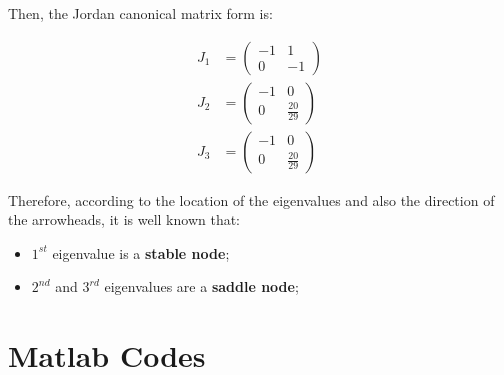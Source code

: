 \documentclass[a4paper,10pt]{article}
\begin{document}
Then, the Jordan canonical matrix form is:

\begin{eqnarray*}
J_1 &= \left(\begin{array}{cc} -1 & 1\\ 0 & -1 \end{array}\right) \\
J_2 &= \left(\begin{array}{cc} -1 & 0\\ 0 & \frac{20}{29} \end{array}\right) \\
J_3 &= \left(\begin{array}{cc} -1 & 0\\ 0 & \frac{20}{29} \end{array}\right)
\end{eqnarray*}

Therefore, according to the location of the eigenvalues and also the direction of the arrowheads, it is well known that: 
\begin{itemize}
 \item $1^{st}$ eigenvalue is a \textbf{stable node};
 \item $2^{nd}$ and $3^{rd}$ eigenvalues are a \textbf{saddle node};
 \end{itemize}
 

\section{Matlab Codes}





\end{document}
